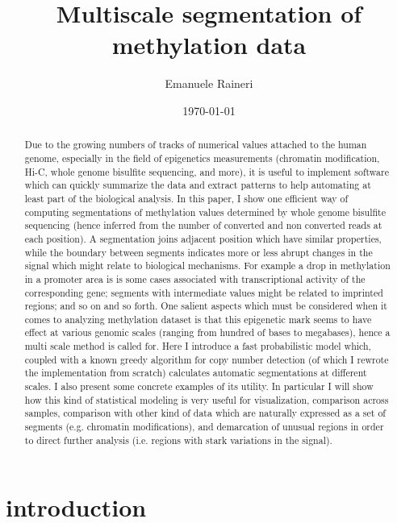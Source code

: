 \documentclass[11pt]{amsart}
\begin{document}
\title{Multiscale segmentation of methylation data}
\author{Emanuele Raineri}
\date{\today}
\maketitle

\begin{abstract}
Due to the growing numbers of tracks of numerical values attached to the 
human genome, especially in the field of epigenetics measurements 
(chromatin modification,
Hi-C, whole genome bisulfite sequencing, and more), 
it is useful to implement software 
which can quickly summarize the data and extract patterns to help 
automating at least  part of the biological analysis. 
In this paper, I show one efficient way of computing 
segmentations of methylation values determined by 
whole genome bisulfite sequencing
(hence inferred from the number of converted and non converted reads 
at each position).  
A segmentation joins adjacent position
which have similar properties, while the boundary between segments 
indicates more or less abrupt changes
in the signal which might relate to biological mechanisms. 
For example
a drop in methylation in a promoter area is is some cases associated with 
transcriptional activity of the corresponding gene; 
segments with intermediate values might be related to imprinted regions; 
and so on and so forth.
One salient aspects which must be considered when it comes to 
analyzing methylation dataset is that this epigenetic mark seems 
to have effect at various genomic scales 
(ranging from hundred of bases to megabases), hence a multi scale method 
is called for. 
Here I introduce a fast probabilistic model which, coupled with a known greedy 
algorithm for copy number detection 
(of which I rewrote the implementation from scratch) 
calculates automatic segmentations at different scales.
I also present some concrete examples of its utility. 
In particular I will show how this 
kind of statistical modeling is very useful for 
visualization, comparison across samples,
comparison with other kind of data which are naturally expressed as a set of 
segments (e.g. chromatin modifications),  and demarcation of unusual regions in 
order to direct further analysis (i.e. regions with stark variations in the signal).
\end{abstract}

\section{introduction}
\end{document}
